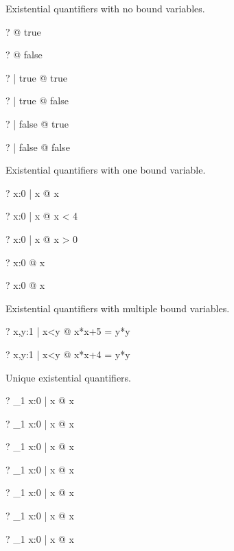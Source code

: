 \documentclass{article}
\begin{document}
Existential quantifiers with no bound variables.
\begin{zed} \vdash?       \exists @ true \end{zed}
\begin{zed} \vdash? \lnot \exists @ false \end{zed}
\begin{zed} \vdash?       \exists | true @ true \end{zed}
\begin{zed} \vdash? \lnot \exists | true @ false \end{zed}
\begin{zed} \vdash? \lnot \exists | false @ true \end{zed}
\begin{zed} \vdash? \lnot \exists | false @ false \end{zed}

Existential quantifiers with one bound variable.
\begin{zed} \vdash? \exists x:0  | x  @ x   \end{zed}
\begin{zed} \vdash? \exists x:0  | x  @ x < 4 \end{zed}
\begin{zed} \vdash? \exists x:0  | x  @ x > 0 \end{zed}
\begin{zed} \vdash? \exists x:0  @ x  \end{zed}
\begin{zed} \vdash? \lnot \exists x:0  @ \lnot x   \end{zed}

Existential quantifiers with multiple bound variables.
\begin{zed} \vdash?       \exists x,y:1  | x<y @ x*x+5 = y*y \end{zed}
\begin{zed} \vdash? \lnot \exists x,y:1  | x<y @ x*x+4 = y*y \end{zed}

Unique existential quantifiers.
\begin{zed} \vdash? \lnot \exists_1 x:0  | x  @ x   \end{zed}
\begin{zed} \vdash? \exists_1 x:0  | x  @ x  \end{zed}
\begin{zed} \vdash? \exists_1 x:0  | x  @ x  \end{zed}
\begin{zed} \vdash? \exists_1 x:0  | x  @ x  \end{zed}
\begin{zed} \vdash? \exists_1 x:0  | x  @ x  \end{zed}
\begin{zed} \vdash? \lnot \exists_1 x:0  | x  @ x  \end{zed}
\begin{zed} \vdash? \lnot \exists_1 x:0  | x  @ \lnot x  \end{zed}
\end{document}
